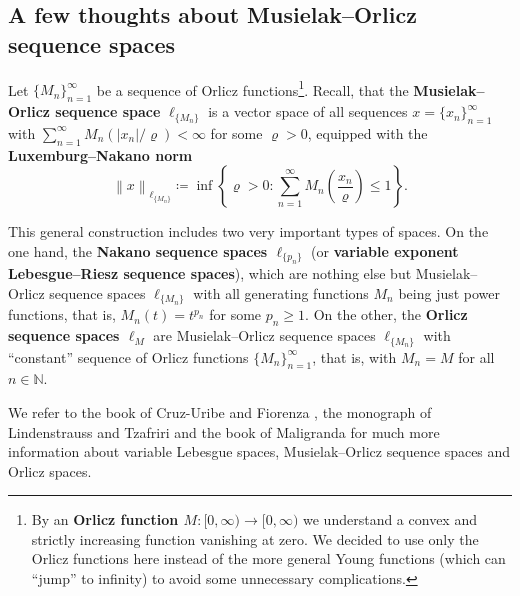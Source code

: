 \documentclass[11pt]{amsart}
\theoremstyle{definition}
\theoremstyle{definition}
\theoremstyle{definition}
\theoremstyle{definition}
\theoremstyle{definition}
\theoremstyle{definition}
\theoremstyle{definition}
\theoremstyle{definition}
\numberwithin{equation}{section}
\numberwithin{equation}{section}
\numberwithin{equation}{section}
\theoremstyle{definition}
\theoremstyle{definition}
\theoremstyle{definition}
\theoremstyle{definition}
\theoremstyle{definition}
\theoremstyle{definition}
\newcommand{\norm}[1]{\left\lVert#1\right\rVert}
\newcommand{\abs}[1]{\left\lvert#1\right\rvert}
\begin{document}
\subsection{A few thoughts about Musielak--Orlicz sequence spaces} \label{SUBSEC: Musielak-Orlicz sequence}
	Let $\{M_n\}_{n=1}^{\infty}$ be a sequence of Orlicz functions\footnote{By an {\bf Orlicz function $M \colon [0,\infty) \rightarrow [0,\infty)$}
	we understand a convex and strictly increasing function vanishing at zero. We decided to use only the Orlicz functions here instead of the more
	general Young functions (which can \enquote{jump} to infinity) to avoid some unnecessary complications.}.
	Recall, that the {\bf Musielak--Orlicz sequence space} $\ell_{\{M_n\}}$ is a vector space of all sequences $x = \{x_n\}_{n=1}^{\infty}$
	with $\sum_{n=1}^{\infty} M_n(\abs{x_n}/\varrho) < \infty$ for some $\varrho > 0$, equipped with the {\bf Luxemburg--Nakano norm}
	\begin{equation*}
		\norm{x}_{\ell_{\{M_n\}}} \coloneqq \inf \left\{ \varrho > 0 \colon \sum_{n=1}^{\infty} M_n\left( \frac{x_n}{\varrho} \right) \leqslant 1 \right\}.
	\end{equation*}
	
		This general construction includes two very important types of spaces.
		On the one hand, the {\bf Nakano sequence spaces $\ell_{\{p_n\}}$} (or {\bf variable exponent Lebesgue--Riesz sequence spaces}),
		which are nothing else but Musielak--Orlicz sequence spaces $\ell_{\{M_n\}}$ with all generating functions $M_n$ being just power functions,
		that is, $M_n(t) = t^{p_n}$ for some $p_n \geqslant 1$.
		On the other, the {\bf Orlicz sequence spaces $\ell_M$} are Musielak--Orlicz sequence spaces $\ell_{\{M_n\}}$ with \enquote{constant}
		sequence of Orlicz functions $\{M_n\}_{n=1}^{\infty}$, that is, with $M_n = M$ for all $n \in \mathbb{N}$.

	We refer to the book of Cruz-Uribe and Fiorenza \cite{CUF13}, the monograph of Lindenstrauss and Tzafriri \cite[Chapter~4]{LT77}
	and the book of Maligranda \cite{Ma89} for much more information about variable Lebesgue spaces, Musielak--Orlicz sequence spaces and Orlicz spaces.
	
\end{document}
